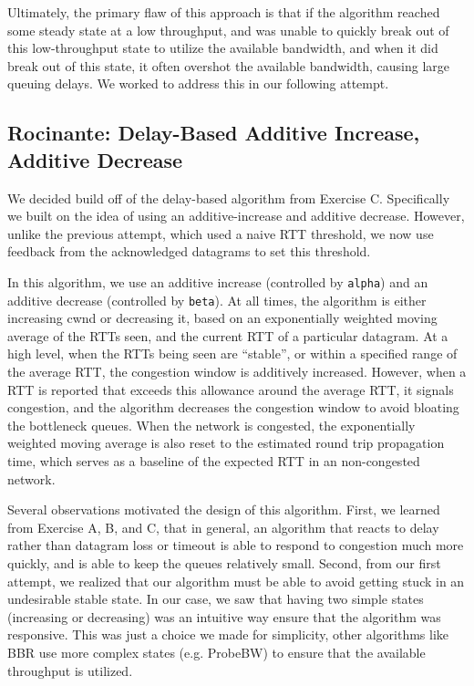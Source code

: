 \documentclass[twoside]{article}
\begin{document}
Ultimately, the primary flaw of this approach is that if the algorithm reached
some steady state at a low throughput, and was unable to quickly break out of
this low-throughput state to utilize the available bandwidth, and when it did
break out of this state, it often overshot the available bandwidth, causing
large queuing delays. We worked to address this in our following attempt.

\subsection*{Rocinante: Delay-Based Additive Increase, Additive Decrease}

We decided build off of the delay-based algorithm from
Exercise C. Specifically we built on the idea of using an additive-increase
and additive decrease. However, unlike the previous attempt, which used a
naive RTT threshold, we now use feedback from the acknowledged datagrams to set
this threshold.

In this algorithm, we use an additive increase (controlled by \texttt{alpha})
and an additive decrease (controlled by \texttt{beta}). At all times, the
algorithm is either increasing cwnd or decreasing it, based on an
exponentially weighted moving average of the RTTs seen, and the current RTT
of a particular datagram. At a high level, when the RTTs being seen are
``stable'', or within a specified range of the average RTT, the congestion
window is additively increased. However, when a RTT is reported that exceeds
this allowance around the average RTT, it signals congestion, and the algorithm
decreases the congestion window to avoid bloating the bottleneck queues.
When the network is congested, the exponentially weighted moving average is
also reset to the estimated round trip propagation time, which serves as a
baseline of the expected RTT in an non-congested network.

Several observations motivated the design of this algorithm. First, we learned
from Exercise A, B, and C, that in general, an algorithm that reacts to delay
rather than datagram loss or timeout is able to respond to congestion much more
quickly, and is able to keep the queues relatively small.
Second, from our first attempt, we realized that our algorithm must be able
to avoid getting stuck in an undesirable stable state. In our case, we saw
that having two simple states (increasing or decreasing) was an intuitive way
ensure that the algorithm was responsive. This was just a choice we made for
simplicity, other algorithms like BBR use more complex states (e.g. ProbeBW) to
ensure that the available throughput is utilized.
\end{document}
